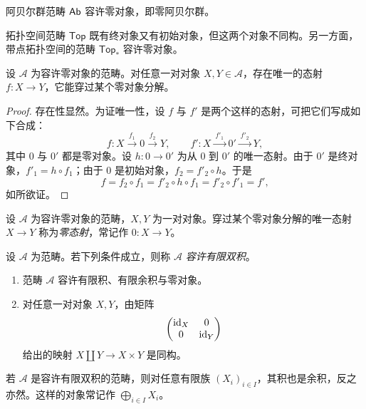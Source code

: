 \begin{example}\label{ex:A.1.2}
阿贝尔群范畴 $\mathsf{Ab}$ 容许零对象，即零阿贝尔群。
\end{example}

\begin{example}\label{ex:A.1.3}
拓扑空间范畴 $\mathsf{Top}$ 既有终对象又有初始对象，但这两个对象不同构。另一方面，带点拓扑空间的范畴 $\mathsf{Top}_*$ 容许零对象。
\end{example}

\begin{lemma}\label{lem:A.1.4}
设 $\mathcal{A}$ 为容许零对象的范畴。对任意一对对象 $X,Y\in\mathcal{A}$，存在唯一的态射 $f:X\to Y$，它能穿过某个零对象分解。
\end{lemma}

\begin{proof}
存在性显然。为证唯一性，设 $f$ 与 $f'$ 是两个这样的态射，可把它们写成如下合成：
\[
f:X\xrightarrow{\ f_1\ }0\xrightarrow{\ f_2\ }Y,\qquad
f':X\xrightarrow{\ f'_1\ }0'\xrightarrow{\ f'_2\ }Y,
\]
其中 $0$ 与 $0'$ 都是零对象。设 $h:0\to 0'$ 为从 $0$ 到 $0'$ 的唯一态射。由于 $0'$ 是终对象，$f'_1=h\circ f_1$；由于 $0$ 是初始对象，$f_2=f'_2\circ h$。于是
\[
f=f_2\circ f_1=f'_2\circ h\circ f_1=f'_2\circ f'_1=f',
\]
如所欲证。
\end{proof}

\begin{definition}\label{def:A.1.5}
设 $\mathcal{A}$ 为容许零对象的范畴，$X,Y$ 为一对对象。穿过某个零对象分解的唯一态射 $X\to Y$ 称为\emph{零态射}，常记作 $0:X\to Y$。
\end{definition}

\begin{definition}\label{def:A.1.6}
设 $\mathcal{A}$ 为范畴。若下列条件成立，则称 $\mathcal{A}$ \emph{容许有限双积}。
\begin{enumerate}[label=(\roman*),leftmargin=2em,itemsep=0.25ex]
  \item 范畴 $\mathcal{A}$ 容许有限积、有限余积与零对象。
  \item 对任意一对对象 $X,Y$，由矩阵
  \[
  \begin{pmatrix}\operatorname{id}_X & 0\\ 0 & \operatorname{id}_Y\end{pmatrix}
  \]
  给出的映射 $X\coprod Y\to X\times Y$ 是同构。
\end{enumerate}
\end{definition}

若 $\mathcal{A}$ 是容许有限双积的范畴，则对任意有限族 $(X_i)_{i\in I}$，其积也是余积，反之亦然。这样的对象常记作 $\bigoplus_{i\in I}X_i$。

